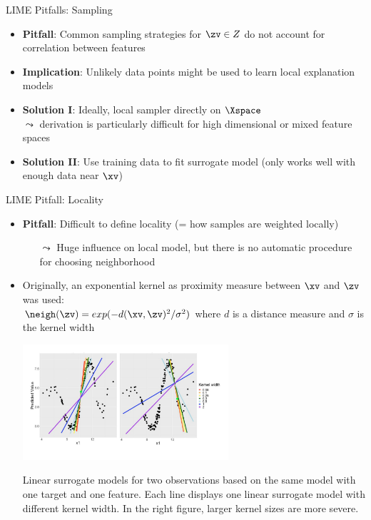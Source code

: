 \documentclass[11pt,compress,t,notes=noshow, aspectratio=169, xcolor=table]{beamer}
\begin{document}
\begin{vbframe}[c]{LIME Pitfalls: Sampling}
	\begin{itemize}
	\itemsep1em
	  \item \textbf{Pitfall}: Common sampling strategies for $\zv \in Z$ do not account for correlation between features 
      \item \textbf{Implication}:  Unlikely data points might be used to learn local explanation models
      \item \textbf{Solution I}: Ideally, local sampler directly on $\Xspace$\\
      $\leadsto$ derivation is particularly difficult for high dimensional or mixed feature spaces 
      \item \textbf{Solution II}: Use training data to fit surrogate model (only works well with enough data near $\xv$)
    \end{itemize}
    
\end{vbframe}

\begin{vbframe}[c]{LIME Pitfall: Locality}

	\begin{itemize} 
     \item \textbf{Pitfall}: Difficult to define locality (= how samples are weighted locally) 
     \begin{itemize}
         \item[$\leadsto$] Huge influence on local model, but there is no automatic procedure for choosing neighborhood
     \end{itemize}
     \item Originally, an exponential kernel as proximity measure between $\xv$ and $\zv$ was used:\\
     	$\neigh(\zv) = exp(-d(\xv, \zv)^2/\sigma^2)$ where $d$ is a distance measure and $\sigma$ is the kernel width 
     	 \begin{center}
     		\includegraphics[width=0.6\textwidth]{figure/lime_locality}
     		\vspace{-0.5cm}
     		
     		\scriptsize{Linear surrogate models for two observations based on the same model with one target and one feature. Each line displays one linear surrogate model with different kernel width. In the right figure, larger kernel sizes are more severe.}
     		
     	\end{center}
     \end{itemize}
\end{vbframe}
\end{document}
